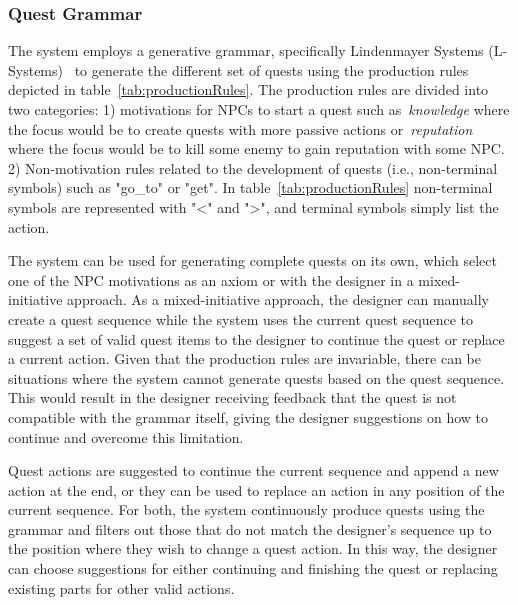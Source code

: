 
\subsubsection{Quest Grammar}

The system employs a generative grammar, specifically Lindenmayer Systems (L-Systems)~ to generate the different set of quests using the production rules depicted in table~\ref{tab:productionRules}. The production rules are divided into two categories: 1) motivations for NPCs to start a quest such as~\emph{knowledge} where the focus would be to create quests with more passive actions or~\emph{reputation} where the focus would be to kill some enemy to gain reputation with some NPC. 2) Non-motivation rules related to the development of quests (i.e., non-terminal symbols) such as "go\_to" or "get". In table~\ref{tab:productionRules} non-terminal symbols are represented with "<" and ">", and terminal symbols simply list the action.


The system can be used for generating complete quests on its own, which select one of the NPC motivations as an axiom or with the designer in a mixed-initiative approach. As a mixed-initiative approach, the designer can manually create a quest sequence while the system uses the current quest sequence to suggest a set of valid quest items to the designer to continue the quest or replace a current action. Given that the production rules are invariable, there can be situations where the system cannot generate quests based on the quest sequence. This would result in the designer receiving feedback that the quest is not compatible with the grammar itself, giving the designer suggestions on how to continue and overcome this limitation.

Quest actions are suggested to continue the current sequence and append a new action at the end, or they can be used to replace an action in any position of the current sequence. For both, the system continuously produce quests using the grammar and filters out those that do not match the designer's sequence up to the position where they wish to change a quest action. In this way, the designer can choose suggestions for either continuing and finishing the quest or replacing existing parts for other valid actions.

